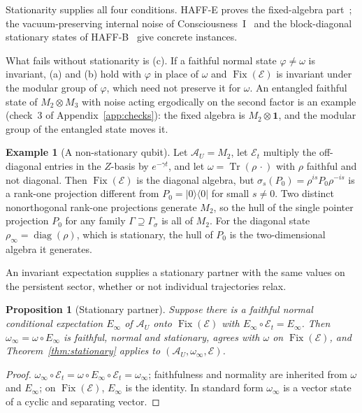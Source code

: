 \documentclass[12pt]{article}
\newtheorem{proposition}[theorem]{Proposition}
\theoremstyle{definition}
\newtheorem{example}[theorem]{Example}
\theoremstyle{remark}
\newcommand{\Fix}{\operatorname{Fix}}
\newcommand{\AU}{\mathcal A_U}
\begin{document}
Stationarity supplies all four conditions. HAFF-E proves the
fixed-algebra part~\cite{HAFFE}; the vacuum-preserving internal noise
of Consciousness~I~\cite{PaperI} and the block-diagonal stationary
states of HAFF-B~\cite{HAFFB} give concrete instances.

What fails without stationarity is (c). If a faithful normal state \(\varphi\neq\omega\)
is invariant, (a) and (b) hold with \(\varphi\) in place of \(\omega\) and
\(\Fix(\mathcal E)\) is invariant under the modular group of \(\varphi\), which need not
preserve it for \(\omega\). An entangled faithful state of \(M_2\otimes M_3\) with noise
acting ergodically on the second factor is an example (check~3 of
Appendix~\ref{app:checks}): the fixed algebra is \(M_2\otimes\mathbf 1\), and the
modular group of the entangled state moves it.

\begin{example}[A non-stationary qubit]\label{ex:qubit}
Let \(\AU=M_2\), let \(\mathcal E_t\) multiply the off-diagonal entries in the
\(Z\)-basis by \(e^{-\gamma t}\), and let \(\omega=\operatorname{Tr}(\rho\,\cdot)\) with
\(\rho\) faithful and not diagonal. Then \(\Fix(\mathcal E)\) is the diagonal algebra,
but \(\sigma_s(P_0)=\rho^{is}P_0\rho^{-is}\) is a rank-one projection different from
\(P_0=|0\rangle\langle0|\) for small \(s\neq0\). Two distinct nonorthogonal rank-one projections
generate \(M_2\), so the hull of the single pointer projection \(P_0\) for any family
\(\Gamma\supseteq\Gamma_\sigma\) is all of \(M_2\). For the diagonal state
\(\rho_\infty=\operatorname{diag}(\rho)\), which is stationary, the hull of \(P_0\) is
the two-dimensional algebra it generates.
\end{example}

An invariant expectation supplies a stationary partner with the same values
on the persistent sector, whether or not individual trajectories relax.

\begin{proposition}[Stationary partner]\label{prop:asymptotic}
Suppose there is a faithful normal conditional expectation \(E_\infty\) of \(\AU\) onto
\(\Fix(\mathcal E)\) with \(E_\infty\circ\mathcal E_t=E_\infty\). Then
\(\omega_\infty=\omega\circ E_\infty\) is faithful, normal and stationary, agrees with
\(\omega\) on \(\Fix(\mathcal E)\), and Theorem~\ref{thm:stationary} applies to
\((\AU,\omega_\infty,\mathcal E)\).
\end{proposition}

\begin{proof}
\(\omega_\infty\circ\mathcal E_t=\omega\circ E_\infty\circ\mathcal E_t=\omega_\infty\);
faithfulness and normality are inherited from \(\omega\) and \(E_\infty\); on
\(\Fix(\mathcal E)\), \(E_\infty\) is the identity. In standard form \(\omega_\infty\) is
a vector state of a cyclic and separating vector.
\end{proof}
\end{document}
